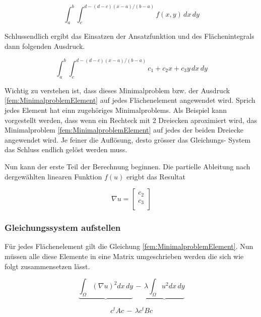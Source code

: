 \begin{equation}
\int_a^b \int_c^{d-(d-c)(x-a)/(b-a)} f(x,y) \, dx\,dy
\label{fem:FlaecheDreieck}
\end{equation}

Schlussendlich ergibt das Einsatzen der Ansatzfunktion und des Flächenintegrals dann folgenden Ausdruck.

\begin{equation}
\int_a^b \int_c^{d-(d-c)(x-a)/(b-a)} c_1 + c_2x + c_3y \, dx \, dy
\label{fem:MinimalproblemElement}
\end{equation}

Wichtig zu verstehen ist, dass dieses Minimalproblem bzw. der Ausdruck \ref{fem:MinimalproblemElement} auf jedes Flächenelement angewendet wird. Sprich jedes Element hat einn zugehöriges Minimalproblems. Als Beispiel kann vorgestellt werden, dass wenn ein Rechteck mit 2 Dreiecken aproximiert wird, das Minimalproblem \ref{fem:MinimalproblemElement} auf jedes der beiden Dreiecke angewendet wird. Je feiner die Auflösung, desto grösser das Gleichungs- System das Schluss endlich gelöst werden muss.

Nun kann der erste Teil der Berechnung beginnen. Die partielle Ableitung nach dergewählten linearen Funktion $f(u)$ erigbt das Resultat

\begin{equation}
	\nabla u = 	
	\left[ \begin{array}{r}
	c_2  \\
	c_3 \\
	\end{array}\right]
	\label{fem:equationSchwarzquadratischP}
\end{equation} 

\subsubsection{Gleichungssystem aufstellen }

Für jedes Flächenelement gilt die Gleichung \ref{fem:MinimalproblemElement}. Nun müssen alle diese Elemente in eine Matrix umgeschrieben werden die sich wie folgt zusammensetzen lässt.

\begin{equation}
			\underbrace{ \int_{\Omega} (\nabla u)^2 dx \, dy} \, -  \, \underbrace{\lambda \int_{\Omega} u^2 dx \,dy}
			\label{fem:Minimal2TermLinAlg}
\end{equation}


\begin{equation}
			c^t Ac \, - \, \lambda c^t Bc
			\label{fem:Minimal2LinAlg}
\end{equation}

